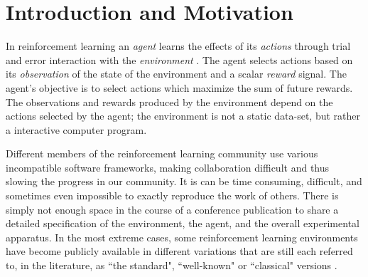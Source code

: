 \documentclass[twoside,11pt]{article}
\begin{document}
\section{Introduction and Motivation}
In reinforcement learning an {\it agent} learns the effects of its {\it actions} through trial and error interaction with the {\it environment} \citep{rlbook, rlsurvey,ndp}. The agent selects actions based on its {\it observation} of the state of the environment and a scalar {\it reward} signal. The agent's objective is to select actions which maximize the sum of future rewards. The observations and rewards produced by the environment depend on the actions selected by the agent; the environment is not a static data-set, but rather a interactive computer program.
 


Different members of the reinforcement learning community use various incompatible software frameworks, making collaboration difficult and thus slowing the progress in our community. It is can be time consuming, difficult, and sometimes even impossible to exactly reproduce the work of others.  There is simply not enough space in the course of a conference publication to share a detailed specification of the environment, the agent, and the overall experimental apparatus.
In the most extreme cases, some reinforcement learning environments have become publicly available in different variations that are still each referred to, in the literature, as ``the standard", ``well-known" or ``classical"  versions \citep{whiteThesis}. %



\end{document}
